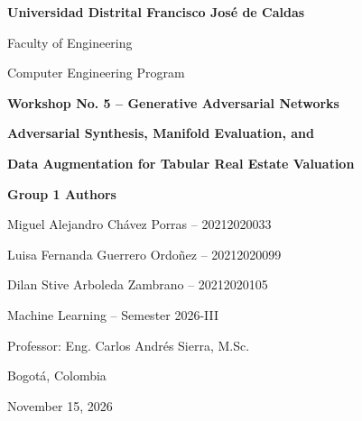 \documentclass[11pt,letterpaper]{article}
\begin{document}
\hypersetup{pageanchor=false}
\begin{titlepage}
\centering
\vspace*{1.0cm}
{\Large\bfseries Universidad Distrital Francisco Jos\'e de Caldas\par}
\vspace{0.55cm}
{\large Faculty of Engineering\par}
{\large Computer Engineering Program\par}

\vfill
{\Large\bfseries Workshop No. 5 -- Generative Adversarial Networks\par}
\vspace{0.8cm}
{\LARGE\bfseries Adversarial Synthesis, Manifold Evaluation, and\par}
\vspace{0.25cm}
{\LARGE\bfseries Data Augmentation for Tabular Real Estate Valuation\par}

\vfill
{\large\bfseries Group 1 Authors\par}
\vspace{0.5cm}
{\large Miguel Alejandro Ch\'avez Porras -- 20212020033\par}
{\large Luisa Fernanda Guerrero Ordo\~nez -- 20212020099\par}
{\large Dilan Stive Arboleda Zambrano -- 20212020105\par}

\vfill
{\large Machine Learning -- Semester 2026-III\par}
{\large Professor: Eng. Carlos Andr\'es Sierra, M.Sc.\par}
{\large Bogot\'a, Colombia\par}
\vspace{0.5cm}
{\large November 15, 2026\par}
\end{titlepage}

\hypersetup{pageanchor=true}
\tableofcontents
\clearpage
{}
\end{document}
